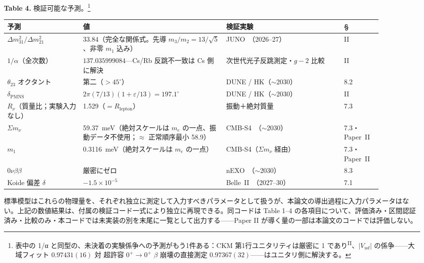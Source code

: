 \documentclass[fontsize=11pt,paper=a4,lualatex]{jlreq}
\newcommand{\PII}{\textsuperscript{\textup{II}}}
\begin{document}
\bigskip
\begin{center}\textbf{Table 4.} 検証可能な予測。\footnote{表中の 1/α と同型の、未決着の実験係争への予測がもう1件ある：CKM 第1行ユニタリティは厳密に 1 であり\PII{}、$|V_{ud}|$ の係争——大域フィット $0.97431(16)$ 対 超許容 $0^+\to0^+$ $\beta$ 崩壊の直接測定 $0.97367(32)$——はユニタリ側に解決する。}\end{center}
\nopagebreak[4]\smallskip\nopagebreak[4]
\begin{center}\footnotesize
\begin{tabular}{@{}p{0.18\linewidth}p{0.34\linewidth}p{0.29\linewidth}p{0.09\linewidth}@{}}
\toprule
予測 & 値 & 検証実験 & \S \\
\midrule
$\Delta m^2_{31}/\Delta m^2_{21}$ & $33.84$（完全な関係式。先導 $m_3/m_2 = 13/\sqrt{5}$、非零 $m_1$ 込み） & JUNO~\cite{juno}（2026--27） & II \\
$1/\alpha$（全次数） & $137.035999084$---Cs/Rb 反跳不一致は Cs 側に解決 & 次世代光子反跳測定・$g{-}2$ 比較 & II \\
$\theta_{23}$ オクタント & 第二（$>45^\circ$） & DUNE / HK（$\sim$2030） & 8.2 \\
$\delta_\mathrm{PMNS}$ & $2\pi(7/13)(1+\varepsilon/13) = 197.1^\circ$ & DUNE / HK（$\sim$2030） & II \\
$R_\nu$（質量比；実験入力なし） & 1.529（$= R_\mathrm{lepton}$） & 振動＋絶対質量 & 7.3 \\
$\Sigma m_\nu$ & 59.37~meV（絶対スケールは $m_e$ の一点、振動データ不使用；$\approx$ 正常順序最小 58.9） & CMB-S4~\cite{cmbs4}（$\sim$2030） & 7.3・Paper~II \\
$m_1$ & 0.3116~meV（絶対スケールは $m_e$ の一点） & CMB-S4（$\Sigma m_\nu$ 経由） & 7.3・Paper~II \\
$0\nu\beta\beta$ & 厳密にゼロ & nEXO~\cite{nexo}（$\sim$2030） & 8.3 \\
Koide 偏差 $\delta$ & $-1.5 \times 10^{-5}$ & Belle~II~\cite{belleii}（2027--30） & 7.1 \\
\bottomrule
\end{tabular}
\end{center}

\bigskip

標準模型はこれらの物理量を、それぞれ独立に測定して入力すべきパラメータとして扱うが、本論文の導出過程に入力パラメータはない。上記の数値結果は、付属の検証コード一式により独立に再現できる。同コードは Table 1–4 の各項目について、評価済み・区間認証済み・比較のみ・本コードでは未実装の別を末尾に一覧として出力する——Paper II が導く量の一部は本論文のコードでは評価しない。
\end{document}
